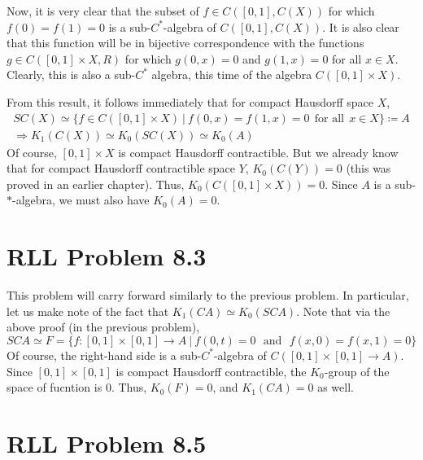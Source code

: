 \documentclass[aps,pra,showpacs,notitlepage,onecolumn,superscriptaddress,nofootinbib]{revtex4-1}
\theoremstyle{definition}
\begin{document}
Now, it is very clear that the subset of $f \in C([0, 1], C(X))$ for which $f(0) = f(1) = 0$ is a sub-$C^{*}$-algebra of $C([0, 1], C(X))$. It is also clear that this function will be in bijective correspondence
with the functions $g \in C([0, 1] \times X, R)$ for which $g(0, x) = 0$ and $g(1, x) = 0$ for all $x \in X$. Clearly, this is also a sub-$C^{*}$ algebra, this time of the algebra $C([0, 1] \times X)$.
\newline

\noindent From this result, it follows immediately that for compact Hausdorff space $X$,
\begin{multline}
  SC(X) \simeq \{f \in C([0, 1] \times X) \ | \ f(0, x) = f(1, x) = 0 \ \ \text{for all} \ \ x \in X\} \coloneqq A
  \\ \Longrightarrow K_1(C(X)) \simeq K_0(SC(X)) \simeq K_0(A)
\end{multline}
Of course, $[0, 1] \times X$ is compact Hausdorff contractible. But we already know that for compact Hausdorff contractible space $Y$, $K_0(C(Y)) = 0$ (this was proved in an earlier chapter).
Thus, $K_0(C([0, 1] \times X)) = 0$. Since $A$ is a sub-$*$-algebra, we must also have $K_0(A) = 0$.

\section{RLL Problem 8.3}

\noindent This problem will carry forward similarly to the previous problem. In particular, let us make note of the fact that $K_1(CA) \simeq K_0(SCA)$. Note that via the above
proof (in the previous problem),
\begin{equation}
  SCA \simeq F = \{ f : [0, 1] \times [0, 1] \rightarrow A \ | \ f(0, t) = 0 \ \ \ \text{and} \ \ \ f(x, 0) = f(x, 1) = 0\}
\end{equation}
Of course, the right-hand side is a sub-$C^{*}$-algebra of $C([0, 1] \times [0, 1] \rightarrow A)$. Since $[0, 1] \times [0, 1]$ is compact Hausdorff contractible,
the $K_0$-group of the space of fucntion is $0$. Thus, $K_0(F) = 0$, and $K_1(CA) = 0$ as well.

\section{RLL Problem 8.5}
\end{document}
